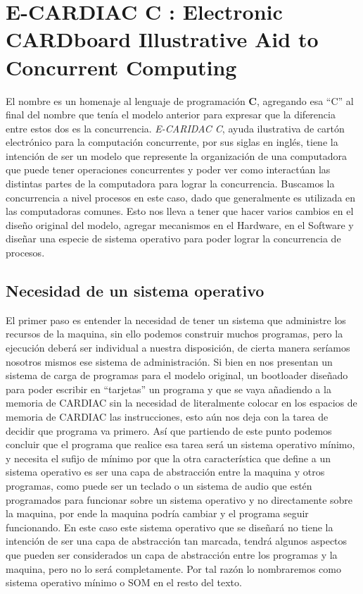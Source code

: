 \documentclass[letterpaper,12pt,oneside]{book}
\begin{document}
	\clearpage	
		
	\section{E-CARDIAC C : Electronic CARDboard Illustrative Aid to Concurrent Computing}
		
	El nombre es un homenaje al lenguaje de programación \textbf{C}, agregando esa ``C'' al final del nombre que tenía el modelo anterior
	para expresar que la diferencia entre estos dos es la concurrencia. \textit{E-CARIDAC C}, ayuda ilustrativa de cartón electrónico para
	la computación concurrente, por sus siglas en inglés, tiene la intención de ser un modelo que represente la organización de una computadora que puede tener operaciones concurrentes
	y poder ver como interactúan las distintas partes de la computadora para lograr la concurrencia. Buscamos la concurrencia a nivel procesos
	en este caso, dado que generalmente es utilizada en las computadoras comunes. Esto nos lleva a tener que hacer varios cambios en el diseño original
	del modelo, agregar mecanismos en el Hardware, en el Software y diseñar una especie de sistema operativo para poder lograr la concurrencia de 
	procesos.
	

	
	
		\subsection{Necesidad de un sistema operativo}
		
		El primer paso es entender la necesidad de tener un sistema que administre los recursos de la maquina, sin ello podemos construir muchos programas, pero
		la ejecución deberá ser individual a nuestra disposición, de cierta manera seríamos nosotros mismos ese sistema de administración. Si bien en 
		\cite[p. 42]{hegelbarger_instruction_1968}
		nos presentan un sistema de carga de programas para el modelo original, un bootloader diseñado para poder escribir en ``tarjetas'' un programa y que se vaya
		añadiendo a la memoria de CARDIAC sin la necesidad de literalmente colocar en los espacios de memoria de CARDIAC las instrucciones, esto aún nos deja
		con la tarea de decidir que programa va primero. Así que partiendo de este punto podemos concluir que el programa que realice esa tarea será un sistema
		operativo mínimo, y necesita el sufijo de mínimo por que la otra característica que define
		a un sistema operativo es ser una capa de abstracción entre la maquina y otros programas, como puede ser un teclado o un sistema de audio que estén programados
		para funcionar sobre un sistema operativo y no directamente sobre la maquina, por ende la maquina podría cambiar y el programa seguir funcionando. En este
		caso este sistema operativo que se diseñará no tiene la intención de ser una capa de abstracción tan marcada, tendrá algunos aspectos que pueden ser considerados
		un capa de abstracción entre los programas y la maquina, pero no lo será completamente. Por tal razón lo nombraremos como sistema operativo mínimo o SOM
		en el resto del texto.
		
\end{document}

